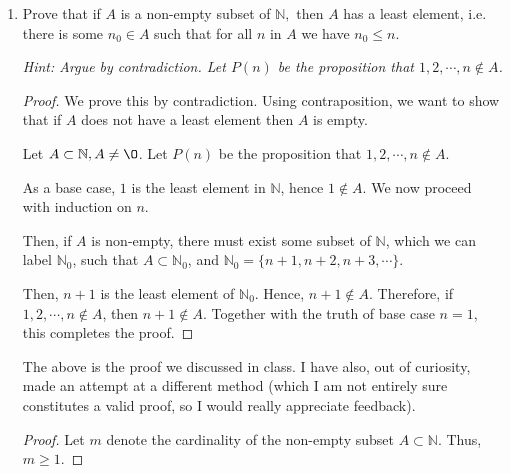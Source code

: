 \documentclass[11pt]{article}
\newcommand{\bbN}{\mathbb{N}}
\renewcommand{\emptyset}{\O}
\begin{document}
\begin{enumerate}
\begin{proof}
Upon expanding and simplifying, this is equivalent to
\[
    1 + (n+1)x + nx^2 \geq 1 + (n+1)x.
\]

The above, when simplified, is equivalent to
\[
    nx^2 \geq 0.
\]

This is true, since $n > 0$ by the definition of natural numbers, and $x^2 \geq 0$ by the trivial inequality. Thus, the base case is true for $n=1$, and truth of $P(n)$ implies truth of $P(n+1)$. This completes the proof. \renewcommand\qedsymbol{QED}

\end{proof}
 
\item  Prove  that if $A$ is a non-empty subset of $\bbN,$ then 
 $A$ has a least element, i.e. there is some $n_0\in A$ such that for all $n$ in $A$ we have $n_0\leq n.$
 
 {\it Hint: Argue by contradiction. Let $P(n)$ be the proposition that $1,2,\cdots, n \not\in A$.}

\begin{proof}

We prove this by contradiction. Using contraposition, we want to show that if $A$ does not have a least element then $A$ is empty.

Let $A \subset \bbN, A \neq \emptyset$. Let $P(n)$ be the proposition that $1,2,\cdots, n \notin A$.

As a base case, $1$ is the least element in $\bbN$, hence $1 \notin A$. We now proceed with induction on $n$.

Then, if $A$ is non-empty, there must exist some subset of $\bbN$, which we can label $\bbN_0$, such that $A \subset \bbN_0$, and $\bbN_0 = \{n+1, n+2, n+3,\cdots\}$. 

Then, $n+1$ is the least element of $\bbN_0$. Hence, $n+1 \notin A$. Therefore, if $1,2,\cdots, n \notin A$, then $n+1 \notin A$. Together with the truth of base case $n=1$, this completes the proof.

\renewcommand\qedsymbol{QED}

\end{proof}


The above is the proof we discussed in class. I have also, out of curiosity, made an attempt at a different method (which I am not entirely sure constitutes a valid proof, so I would really appreciate feedback).

\begin{proof}

Let $m$ denote the cardinality of the non-empty subset $A \subset \bbN$. Thus, $m \geq 1$.


\end{proof}
\end{enumerate}
\end{document}
